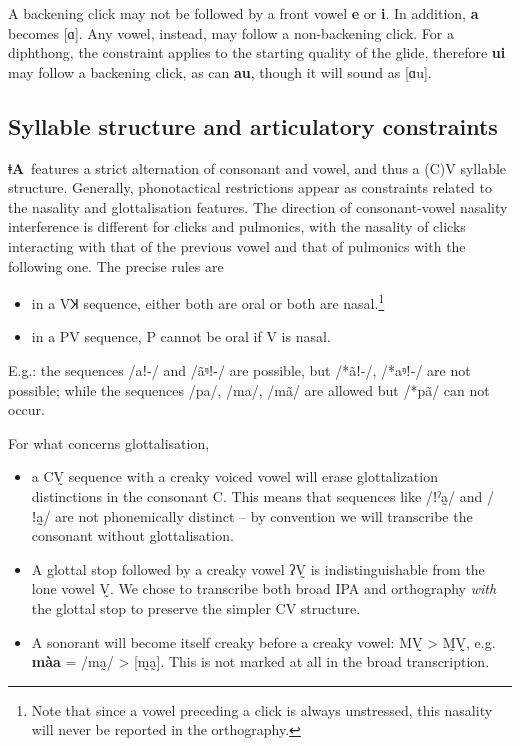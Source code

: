 \documentclass[11pt]{book}
\newcommand{\qcn}[1]{\textbf{#1}}
\newcommand{\langname}{\qcn{ǂA}~}
\begin{document}
A backening click may not be followed by a front vowel \qcn{e} or \qcn{i}. In addition, \qcn{a} becomes [ɑ]. Any vowel, instead, may follow a non-backening click. For a diphthong, the constraint applies to the starting quality of the glide, therefore \qcn{ui} may follow a backening click, as can \qcn{au}, though it will sound as [ɑu].

\subsection{Syllable structure and articulatory constraints}\label{sec:syllables}

\langname features a strict alternation of consonant and vowel, and thus a (C)V syllable structure. Generally, phonotactical restrictions appear as constraints related to the nasality and glottalisation features. The direction of consonant-vowel nasality interference is different for clicks and pulmonics, with the nasality of clicks interacting with that of the previous vowel and that of pulmonics with the following one. The precise rules are

\begin{itemize}
	\item in a VꞰ sequence, either both are oral or both are nasal.\footnote{Note that since a vowel preceding a click is always unstressed, this nasality will never be reported in the orthography.}
	\item in a PV sequence, P cannot be oral if V is nasal.
\end{itemize}

E.g.: the sequences /aǃ-/ and /ãᵑǃ-/ are possible, but /*ãǃ-/, /*aᵑǃ-/ are not possible; while the sequences /pa/, /ma/, /mã/ are allowed but /*pã/ can not occur.

For what concerns glottalisation, 

\begin{itemize}
\item a CV̰ sequence with a creaky voiced vowel will erase glottalization distinctions in the consonant C. This means that sequences like /ǃˀa̰/ and /ǃa̰/ are not phonemically distinct -- by convention we will transcribe the consonant without glottalisation. 
\item A glottal stop followed by a creaky vowel ʔV̰ is indistinguishable from the lone vowel V̰. We chose to transcribe both broad IPA and orthography \emph{with} the glottal stop to preserve the simpler CV structure.
\item A sonorant will become itself creaky before a creaky vowel: MV̰ > M̰V̰, e.g. \qcn{màa} = /ma̰/ > [m̰a̰]. This is not marked at all in the broad transcription.
\end{itemize}
\end{document}
